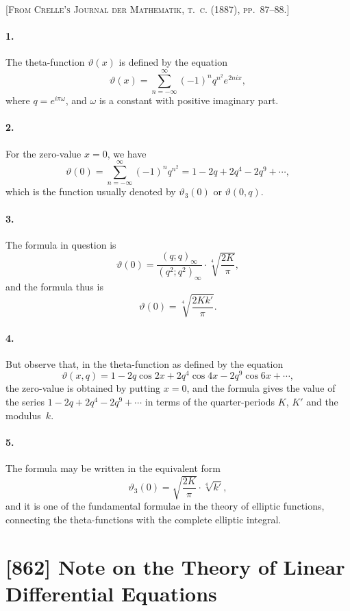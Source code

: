\documentclass[11pt,a4paper]{book}
\begin{document}
\noindent\textsc{[From Crelle's Journal der Mathematik, t.~c. (1887), pp.~87--88.]}

\smallskip

\paragraph{1.} The theta-function $\vartheta(x)$ is defined by the equation
\[
\vartheta(x) = \sum_{n=-\infty}^{\infty} (-1)^{n} q^{n^{2}} e^{2nix},
\]
where $q = e^{i\pi\omega}$, and $\omega$ is a constant with positive imaginary part.

\paragraph{2.} For the zero-value $x = 0$, we have
\[
\vartheta(0) = \sum_{n=-\infty}^{\infty} (-1)^{n} q^{n^{2}} = 1 - 2q + 2q^{4} - 2q^{9} + \cdots,
\]
which is the function usually denoted by $\vartheta_{3}(0)$ or $\vartheta(0, q)$.

\paragraph{3.} The formula in question is
\[
\vartheta(0) = \frac{(q; q)_{\infty}}{(q^{2}; q^{2})_{\infty}} \cdot \sqrt[4]{\frac{2K}{\pi}},
\]
and the formula thus is
\[
\vartheta(0) = \sqrt[4]{\frac{2Kk'}{\pi}}.
\]

\paragraph{4.} But observe that, in the theta-function as defined by the equation
\[
\vartheta(x, q) = 1 - 2q\cos 2x + 2q^{4}\cos 4x - 2q^{9}\cos 6x + \cdots,
\]
the zero-value is obtained by putting $x = 0$, and the formula gives the value of the series $1 - 2q + 2q^{4} - 2q^{9} + \cdots$ in terms of the quarter-periods $K$, $K'$ and the modulus~$k$.

\paragraph{5.} The formula may be written in the equivalent form
\[
\vartheta_{3}(0) = \sqrt{\frac{2K}{\pi}} \cdot \sqrt[4]{k'},
\]
and it is one of the fundamental formulae in the theory of elliptic functions, connecting the theta-functions with the complete elliptic integral.

\newpage
\section*{[862] Note on the Theory of Linear Differential Equations}
\end{document}
